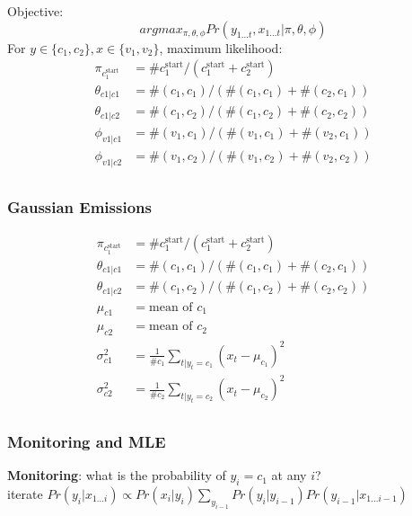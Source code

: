 \documentclass[]{article}
\theoremstyle{definition}
\begin{document}
Objective:
\begin{equation*}
    argmax_{\pi, \theta, \phi} Pr(y_{1 \ldots t}, x_{1 \ldots t} | \pi, \theta, \phi)
\end{equation*}
For $y \in \{c_1, c_2\}, x \in \{v_1, v_2\}$, maximum likelihood:
\begin{align*}
    \pi_{c_1^{\text{start}}} &= \# c_1^{\text{start}} / (c_1^{\text{start}} + c_2^{\text{start}}) \\
    \theta_{c1|c1} &= \#(c_1, c_1) / (\#(c_1, c_1) + \#(c_2, c_1)) \\
    \theta_{c1|c2} &= \#(c_1, c_2) / (\#(c_1, c_2) + \#(c_2, c_2)) \\
    \phi_{v1|c1} &= \#(v_1, c_1) / (\#(v_1, c_1) + \#(v_2, c_1)) \\
    \phi_{v1|c2} &= \#(v_1, c_2) / (\#(v_1, c_2) + \#(v_2, c_2)) \\
\end{align*}

\subsubsection{Gaussian Emissions}
\label{ssub:Gaussian Emissions}


\begin{align*}
    \pi_{c_1^{\text{start}}} &= \# c_1^{\text{start}} / (c_1^{\text{start}} + c_2^{\text{start}}) \\
    \theta_{c1|c1} &= \#(c_1, c_1) / (\#(c_1, c_1) + \#(c_2, c_1)) \\
    \theta_{c1|c2} &= \#(c_1, c_2) / (\#(c_1, c_2) + \#(c_2, c_2)) \\
    \mu_{c1} &= \text{mean of } c_1 \\
    \mu_{c2} &= \text{mean of } c_2 \\
    \sigma_{c1}^2 &= \frac{1}{\# c_1} \sum_{t | y_t = c_1} (x_t - \mu_{c_1})^2 \\
    \sigma_{c2}^2 &= \frac{1}{\# c_2} \sum_{t | y_t = c_2} (x_t - \mu_{c_2})^2 \\
\end{align*}

\subsubsection{Monitoring and MLE}
\label{ssub:Monitoring and ML}

\textbf{Monitoring}: what is the probability of $y_i = c_1$ at any $i$? \\
iterate $Pr(y_i | x_{1 \ldots i}) \propto Pr(x_i | y_i) \sum_{y_{i-1}} Pr(y_i | y_{i-1}) Pr(y_{i-1} | x_{1 \ldots i-1})$
\end{document}
